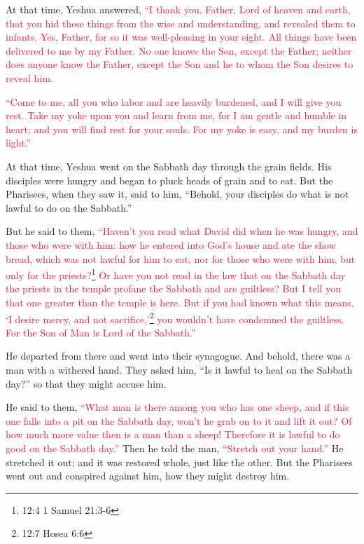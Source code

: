 \myverse{}At that time, Yeshua answered,
\textcolor{crimson}{“I thank you, Father, Lord of heaven and earth, that you hid these things from the wise and understanding,
	and revealed them to infants.
}
\myverse{}\textcolor{crimson}{Yes, Father, for so it was well-pleasing in your sight.
}
\myverse{}\textcolor{crimson}{All things have been delivered to me by my Father. No one knows the Son,
	except the Father; neither does anyone know the Father, except the Son and he to whom the Son desires
	to reveal him.}

\myverse{}\textcolor{crimson}{“Come to me, all you who labor and are heavily burdened,
	and I will give you rest.
}
\myverse{}\textcolor{crimson}{Take my yoke upon you and learn from me, for I am gentle and humble in
	heart; and you will find rest for your souls.
}
\myverse{}\textcolor{crimson}{For my yoke is easy, and my burden is light.”}


\mychapter{} \myverse*{}At that time, Yeshua went on the Sabbath day through the grain
fields. His disciples were hungry and began to pluck heads of grain and to eat.
\myverse{}But the Pharisees, when they saw it, said to him, “Behold, your disciples do
what is not lawful to do on the Sabbath.”

\myverse{}But he said to them,
\textcolor{crimson}{“Haven’t you read what David did when he was hungry, and those who were with him:
}
\myverse{}\textcolor{crimson}{how he entered into God’s house and ate the show bread, which was not lawful
	for him to eat, nor for those who were with him, but only for the priests?}\footnote{12:4 1 Samuel 21:3-6}
\myverse{}\textcolor{crimson}{Or have you not read in the law that on the Sabbath day the priests in
	the temple profane the Sabbath and are guiltless?
}
\myverse{}\textcolor{crimson}{But I tell you that one greater than the temple is here.
}
\myverse{}\textcolor{crimson}{But if you had known what this means, ‘I desire mercy, and not sacrifice,’}\footnote{12:7 Hosea 6:6}
\textcolor{crimson}{you wouldn’t have condemned the guiltless.
}
\myverse{}\textcolor{crimson}{For the Son of Man is Lord of the Sabbath.”}

\myverse{}He departed from there and went into their synagogue.
\myverse{}And behold, there was a man with a withered hand. They asked him, “Is it
lawful to heal on the Sabbath day?” so that they might accuse him.

\myverse{}He said to them,
\textcolor{crimson}{“What man is there among you who has one sheep, and if this one falls into a pit on the Sabbath day,
	won’t he grab on to it and lift it out?
}
\myverse{}\textcolor{crimson}{Of how much more value then is a man than a sheep! Therefore it is lawful
	to do good on the Sabbath day.”}
\myverse{}Then he told the man,
\textcolor{crimson}{“Stretch out your hand.”} He stretched it out; and it was restored whole, just like the other.
\myverse{}But the Pharisees went out and conspired against him, how they might destroy
him.

